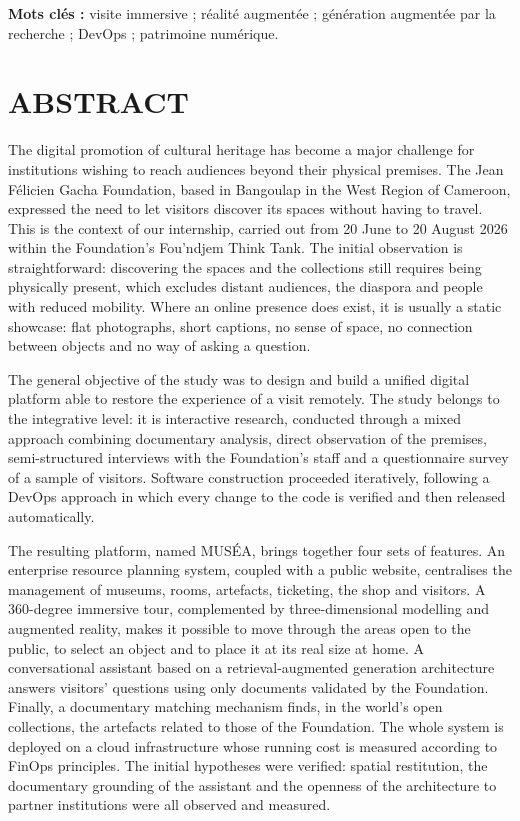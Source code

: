 \vspace{0.5cm}
\noindent\textbf{Mots clés :} visite immersive ; réalité augmentée ;
génération augmentée par la recherche ; DevOps ; patrimoine numérique.
\endgroup

\cleardoublepage
{}
\chapter*{ABSTRACT}

\begingroup
{}

The digital promotion of cultural heritage has become a major challenge for
institutions wishing to reach audiences beyond their physical premises. The Jean
Félicien Gacha Foundation, based in Bangoulap in the West Region of Cameroon,
expressed the need to let visitors discover its spaces without having to travel.
This is the context of our internship, carried out from 20 June to 20 August
2026 within the Foundation's Fou'ndjem Think Tank. The initial observation is
straightforward: discovering the spaces and the collections still requires being
physically present, which excludes distant audiences, the diaspora and people
with reduced mobility. Where an online presence does exist, it is usually a
static showcase: flat photographs, short captions, no sense of space, no
connection between objects and no way of asking a question.

The general objective of the study was to design and build a unified digital
platform able to restore the experience of a visit remotely. The study belongs
to the integrative level: it is interactive research, conducted through a mixed
approach combining documentary analysis, direct observation of the premises,
semi-structured interviews with the Foundation's staff and a questionnaire
survey of a sample of visitors. Software construction proceeded iteratively,
following a DevOps approach in which every change to the code is verified and
then released automatically.

The resulting platform, named MUSÉA, brings together four sets of features. An
enterprise resource planning system, coupled with a public website, centralises
the management of museums, rooms, artefacts, ticketing, the shop and visitors.
A 360-degree immersive tour, complemented by three-dimensional modelling and
augmented reality, makes it possible to move through the areas open to the
public, to select an object and to place it at its real size at home. A
conversational assistant based on a retrieval-augmented generation architecture
answers visitors' questions using only documents validated by the Foundation.
Finally, a documentary matching mechanism finds, in the world's open
collections, the artefacts related to those of the Foundation. The whole system
is deployed on a cloud infrastructure whose running cost is measured according
to FinOps principles. The initial hypotheses were verified: spatial restitution,
the documentary grounding of the assistant and the openness of the architecture
to partner institutions were all observed and measured.

